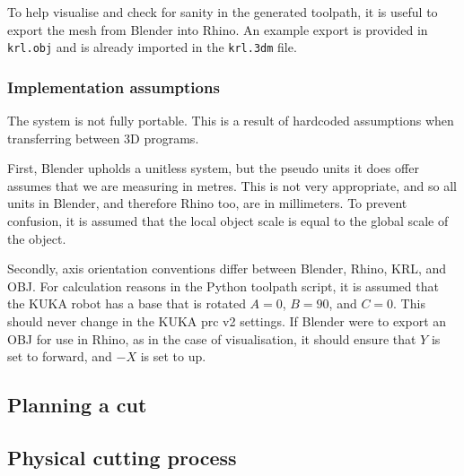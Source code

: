 To help visualise and check for sanity in the generated toolpath, it is useful to export the mesh from Blender into Rhino. An example export is provided in {\tt krl.obj} and is already imported in the {\tt krl.3dm} file.

\subsubsection{Implementation assumptions}

The system is not fully portable. This is a result of hardcoded assumptions when transferring between 3D programs.

First, Blender upholds a unitless system, but the pseudo units it does offer assumes that we are measuring in metres. This is not very appropriate, and so all units in Blender, and therefore Rhino too, are in millimeters. To prevent confusion, it is assumed that the local object scale is equal to the global scale of the object.

Secondly, axis orientation conventions differ between Blender, Rhino, KRL, and OBJ. For calculation reasons in the Python toolpath script, it is assumed that the KUKA robot has a base that is rotated $A = 0$, $B = 90$, and $C =  0$. This should never change in the KUKA prc v2 settings. If Blender were to export an OBJ for use in Rhino, as in the case of visualisation, it should ensure that $Y$ is set to forward, and $-X$ is set to up.

\subsection{Planning a cut}
\subsection{Physical cutting process}
